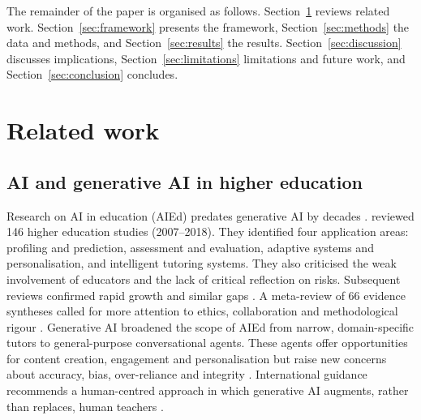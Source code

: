 \documentclass[pdflatex,sn-basic]{sn-jnl}%
\theoremstyle{plain}
\theoremstyle{remark}
\begin{document}
The remainder of the paper is organised as follows. Section~\ref{sec:related} reviews related work. Section~\ref{sec:framework} presents the framework, Section~\ref{sec:methods} the data and methods, and Section~\ref{sec:results} the results. Section~\ref{sec:discussion} discusses implications, Section~\ref{sec:limitations} limitations and future work, and Section~\ref{sec:conclusion} concludes.

\section{Related work}
\label{sec:related}

\subsection{AI and generative AI in higher education}
Research on AI in education (AIEd) predates generative AI by decades \citep{luckin2016,holmes2019}. \citet{zawacki2019} reviewed 146 higher education studies (2007--2018). They identified four application areas: profiling and prediction, assessment and evaluation, adaptive systems and personalisation, and intelligent tutoring systems. They also criticised the weak involvement of educators and the lack of critical reflection on risks. Subsequent reviews confirmed rapid growth and similar gaps \citep{crompton2023}. A meta-review of 66 evidence syntheses called for more attention to ethics, collaboration and methodological rigour \citep{bond2024}. Generative AI broadened the scope of AIEd from narrow, domain-specific tutors to general-purpose conversational agents. These agents offer opportunities for content creation, engagement and personalisation but raise new concerns about accuracy, bias, over-reliance and integrity \citep{kasneci2023,dwivedi2023,rudolph2023,cotton2024}. International guidance recommends a human-centred approach in which generative AI augments, rather than replaces, human teachers \citep{unesco2023}.
\end{document}
